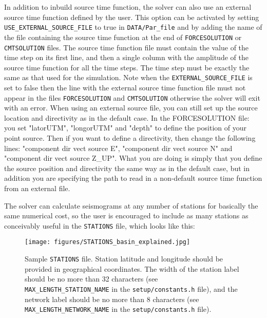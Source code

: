 In addition to inbuild source time function, the solver can also use an external source time function defined by the user. This option can be activated by setting \texttt{USE\_EXTERNAL\_SOURCE\_FILE} to true in \texttt{DATA/Par\_file} and by adding the name of the file containing the source time function at the end of \texttt{FORCESOLUTION} or \texttt{CMTSOLUTION} files.
The source time function file must contain the value of the time step on its first line, and then a single column with the amplitude of the source time function for all the time steps. The time step must be exactly the same as that used for the simulation. Note  when the  \texttt{EXTERNAL\_SOURCE\_FILE} is set to false then the line with the external source time function file must not appear in the files  \texttt{FORCESOLUTION} and \texttt{CMTSOLUTION} otherwise the solver will exit with an error. When using an external source file, you can still set up the source location and directivity as in the default case.
In the FORCESOLUTION file: you set "latorUTM", "longorUTM" and "depth" to define the position of your point source. Then if you want to define a directivity, then change the following lines: "component dir vect source E", "component dir vect source N" and "component dir vect source Z\_UP". What you are doing is simply that you define the source position and directivity the same way as in the default case, but in addition you are specifying the path to read in a non-default source time function from an external file.

\vspace{1cm}

The solver can calculate seismograms at any number of stations for
basically the same numerical cost, so the user is encouraged to include
as many stations as conceivably useful in the \texttt{STATIONS} file,
which looks like this:
%
\begin{figure}[H]
\begin{centering}
\texttt{[image: figures/STATIONS\_basin\_explained.jpg]}
\par
\end{centering}
\caption{Sample \texttt{STATIONS} file. Station latitude and longitude should
be provided in geographical coordinates. The width of the station
label should be no more than 32 characters (see \texttt{MAX\_LENGTH\_STATION\_NAME}
in the \texttt{setup/constants.h} file), and the network label should be
no more than 8 characters (see \texttt{MAX\_LENGTH\_NETWORK\_NAME}
in the \texttt{setup/constants.h} file).}
\label{fig:Sample-STATIONS-file.}
\end{figure}



